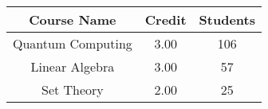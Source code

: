 \documentclass{article}
\begin{document}
\begin{tabular}{|c|c|c|} 
\hline %
Course Name & Credit & Students \\
\hline
Quantum Computing & 3.00 & 106 \\
\hline
Linear Algebra & 3.00 & 57 \\
\hline
Set Theory & 2.00 & 25 \\
\hline
\end{tabular}
\end{document}
